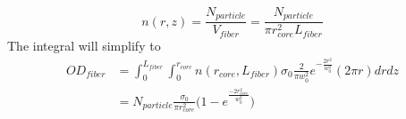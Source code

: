 \begin{equation}
	n(r, z) = \frac{N_{particle}}{V_{fiber}} = \frac{N_{particle}}{\pi r_{core}^2L_{fiber}} 
\end{equation}
The integral will simplify to
\begin{equation}
	\begin{aligned}
		OD_{fiber} &= \int^{L_{fiber}}_0 \int^{r_{core}}_0  n(r_{core}, L_{fiber})\sigma_0 \frac{2}{\pi w_0^2}e^{-\frac{2r^2}{w_0^2}}(2\pi r) dr dz\\
		&= N_{particle}\frac{\sigma_0}{\pi r^2_{core}}\big(1-e^{\frac{-2r_{core}^2}{w_0^2}}\big)
	\label{OD}
	\end{aligned}
\end{equation}